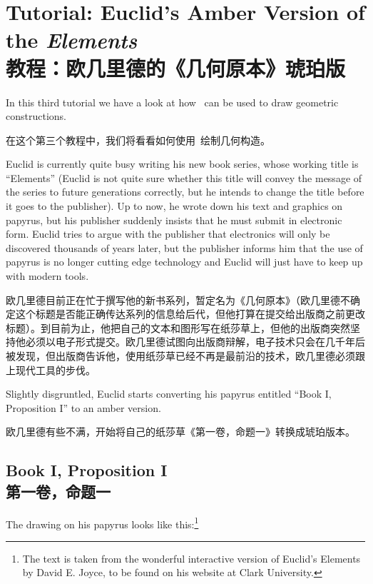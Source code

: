 %
%
%


\section{Tutorial: Euclid's Amber Version of the \emph{Elements}\\教程：欧几里德的《几何原本》琥珀版}

In this third tutorial we have a look at how \tikzname\ can be used to draw
geometric constructions.

在这个第三个教程中，我们将看看如何使用\tikzname\ 绘制几何构造。

Euclid is currently quite busy writing his new book series, whose working title
is ``Elements'' (Euclid is not quite sure whether this title will convey the
message of the series to future generations correctly, but he intends to change
the title before it goes to the publisher). Up to now, he wrote down his text
and graphics on papyrus, but his publisher suddenly insists that he must submit
in electronic form. Euclid tries to argue with the publisher that electronics
will only be discovered thousands of years later, but the publisher informs him
that the use of papyrus is no longer cutting edge technology and Euclid will
just have to keep up with modern tools.

欧几里德目前正在忙于撰写他的新书系列，暂定名为《几何原本》（欧几里德不确定这个标题是否能正确传达系列的信息给后代，但他打算在提交给出版商之前更改标题）。到目前为止，他把自己的文本和图形写在纸莎草上，但他的出版商突然坚持他必须以电子形式提交。欧几里德试图向出版商辩解，电子技术只会在几千年后被发现，但出版商告诉他，使用纸莎草已经不再是最前沿的技术，欧几里德必须跟上现代工具的步伐。

Slightly disgruntled, Euclid starts converting his papyrus entitled ``Book I,
Proposition I'' to an amber version.

欧几里德有些不满，开始将自己的纸莎草《第一卷，命题一》转换成琥珀版本。


\subsection{Book I, Proposition I\\第一卷，命题一}

The drawing on his papyrus looks like this:\footnote{The text is taken from the
wonderful interactive version of Euclid's Elements by David E. Joyce, to be
found on his website at Clark University.}

